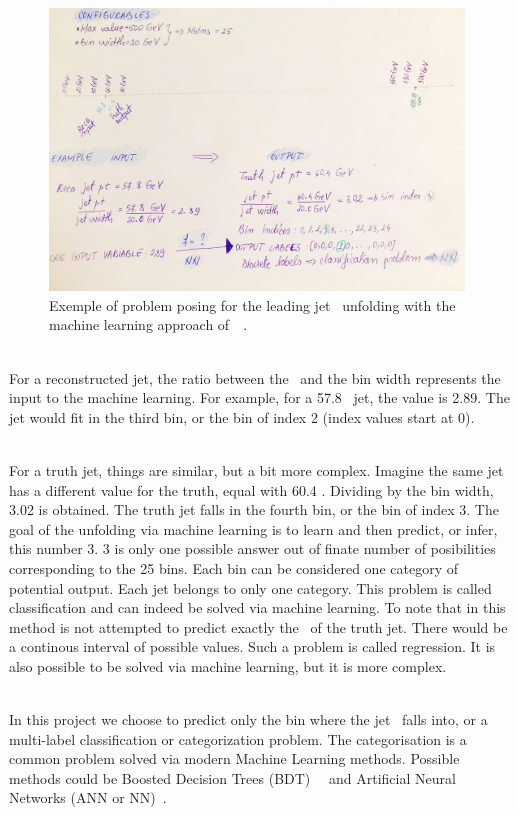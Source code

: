 \begin{figure}[h]
  \centering
  \includegraphics[width=0.98\textwidth]{../presentation/plots/PhysicsProblem.jpg}
  \caption{Exemple of problem posing for the leading jet \pt~unfolding with the machine learning approach of~\cite{AGlazov}~\cite{AGlazovCode}.}
  \label{fig:PhysicsProblem}
\end{figure}

\ \\For a reconstructed jet, the ratio between the \pt~and the bin width represents the input to the machine learning. For example, for a 57.8 \GeV~jet, the value is 2.89. The jet would fit in the third bin, or the bin of index 2 (index values start at 0).

\ \\For a truth jet, things are similar, but a bit more complex. Imagine the same jet has a different value for the truth, equal with 60.4 \GeV. Dividing by the bin width, 3.02 is obtained. The truth jet falls in the fourth bin, or the bin of index 3. The goal of the unfolding via machine learning is to learn and then predict, or infer, this number 3. 3 is only one possible answer out of finate number of posibilities corresponding to the 25 bins. Each bin can be considered one category of potential output. Each jet belongs to only one category. This problem is called classification and can indeed be solved via machine learning. To note that in this method is not attempted to predict exactly the \pt~of the truth jet. There would be a continous interval of possible values. Such a problem is called regression. It is also possible to be solved via machine learning, but it is more complex. 

\ \\In this project we choose to predict only the bin where the jet \pt~falls into, or a multi-label classification or categorization problem. The categorisation is a common problem solved via modern Machine Learning methods. Possible methods could be Boosted Decision Trees (BDT)~\cite{JoshuaBendavid}~\cite{AndrewNg} and Artificial Neural Networks (ANN or NN)~\cite{AndrewNg}. 

